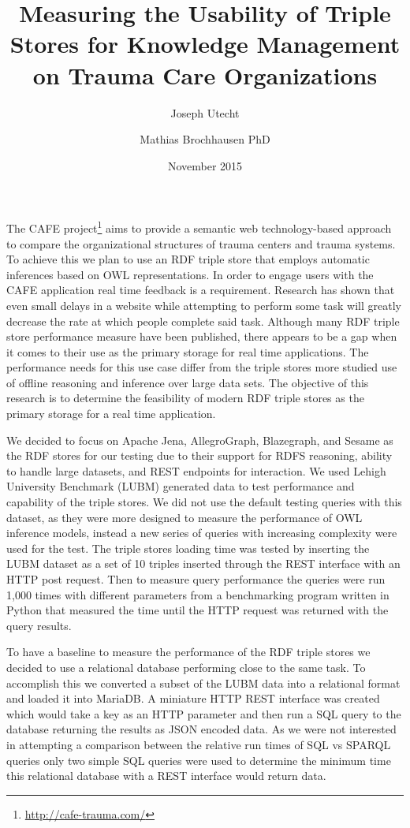 \documentclass{llncs}
\title{Measuring the Usability of Triple Stores for Knowledge Management on Trauma Care Organizations}
\author{Joseph Utecht \and Mathias Brochhausen PhD}
\institute{Department of Biomedical Informatics, University of Arkansas for Medical Sciences, Little Rock, AR}
\date{November 2015}
\begin{document}
\maketitle

The CAFE project\footnote{\url{http://cafe-trauma.com/}} aims to provide a semantic web technology-based approach to compare the organizational structures of trauma centers and trauma systems. To achieve this we plan to use an RDF triple store that employs automatic inferences based on OWL representations. In order to engage users with the CAFE application real time feedback is a requirement. Research has shown that even small delays in a website while attempting to perform some task will greatly decrease the rate at which people complete said task\cite{Galletta2002}. Although many RDF triple store performance measure have been published, there appears to be a gap when it comes to their use as the primary storage for real time applications. The performance needs for this use case differ from the triple stores more studied use of offline reasoning and inference over large data sets. The objective of this research is to determine the feasibility of modern RDF triple stores as the primary storage for a real time application.

We decided to focus on Apache Jena, AllegroGraph, Blazegraph, and Sesame as the RDF stores for our testing due to their support for RDFS reasoning, ability to handle large datasets, and REST endpoints for interaction. We used Lehigh University Benchmark (LUBM)\cite{Guo2005} generated data to test performance and capability of the triple stores.  We did not use the default testing queries with this dataset, as they were more designed to measure the performance of OWL inference models, instead a new series of queries with increasing complexity were used for the test.  The triple stores loading time was tested by inserting the LUBM dataset as a set of 10 triples inserted through the REST interface with an HTTP post request.  Then to measure query performance the queries were run 1,000 times with different parameters from a benchmarking program written in Python that measured the time until the HTTP request was returned with the query results.

To have a baseline to measure the performance of the RDF triple stores we decided to use a relational database performing close to the same task.  To accomplish this we converted a subset of the LUBM data into a relational format and loaded it into MariaDB. A miniature HTTP REST interface was created which would take a key as an HTTP parameter and then run a SQL query to the database returning the results as JSON encoded data. As we were not interested in attempting a comparison between the relative run times of SQL vs SPARQL queries only two simple SQL queries were used to determine the minimum time this relational database with a REST interface would return data.
\end{document}
